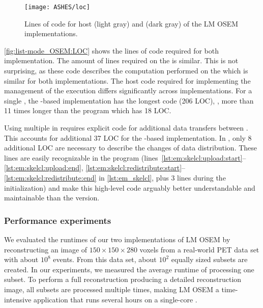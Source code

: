 \begin{figure}
  \centering
  \texttt{[image: ASHES/loc]}
  \caption[Lines of code of the LM OSEM implementations.]%
          {Lines of code for host (light gray) and \GPU (dark gray) of the LM OSEM implementations.}
  \label{fig:list-mode_OSEM:LOC}
\end{figure}

\autoref{fig:list-mode_OSEM:LOC} shows the lines of code required for both implementation.
The amount of lines required on the \GPU is similar.
This is not surprising, as these code describes the computation performed on the \GPU which is similar for both implementations.
The host code required for implementing the management of the \GPU execution differs significantly across implementations.
For a single \GPU, the \OpenCL-based implementation has the longest code (206 LOC), \ie, more than 11 times longer than the \SkelCL program which has 18 LOC.

Using multiple \GPUs in \OpenCL requires explicit code for additional data transfers between \GPUs.
This accounts for additional 37 LOC for the \OpenCL-based implementation.
In \SkelCL, only 8 additional LOC are necessary to describe the changes of data distribution.
These lines are easily recognizable in the \SkelCL program (lines~\ref{lst:em:skelcl:upload:start}--\ref{lst:em:skelcl:upload:end}, \ref{lst:em:skelcl:redistribute:start}--\ref{lst:em:skelcl:redistribute:end} in \autoref{lst:em_skelcl}, plus 3 lines during the initialization) and make this high-level code arguably better understandable and maintainable than the \OpenCL version.













\subsubsection*{Performance experiments}
We evaluated the runtimes of our two implementations of LM OSEM by reconstructing an image of $150\times 150\times 280$ voxels from a real-world PET data set with about $10^8$ events.
From this data set, about $10^2$ equally sized subsets are created.
In our experiments, we measured the average runtime of processing one subset.
To perform a full reconstruction producing a detailed reconstruction image, all subsets are processed multiple times, making LM OSEM a time-intensive application that runs several hours on a single-core \CPU.

